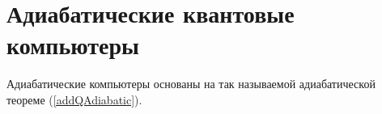 \section{Адиабатические квантовые компьютеры}

Адиабатические компьютеры основаны на так называемой адиабатической
теореме (\ref {addQAdiabatic}).
